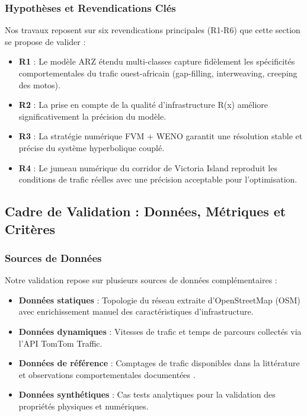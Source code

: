 \subsubsection{Hypothèses et Revendications Clés}
\label{subsec:hypotheses_revendications}

Nos travaux reposent sur six revendications principales (R1-R6) que cette section se propose de valider :

\begin{itemize}
    \item \textbf{R1} : Le modèle ARZ étendu multi-classes capture fidèlement les spécificités comportementales du trafic ouest-africain (gap-filling, interweaving, creeping des motos).
    \item \textbf{R2} : La prise en compte de la qualité d'infrastructure R(x) améliore significativement la précision du modèle.
    \item \textbf{R3} : La stratégie numérique FVM + WENO garantit une résolution stable et précise du système hyperbolique couplé.
    \item \textbf{R4} : Le jumeau numérique du corridor de Victoria Island reproduit les conditions de trafic réelles avec une précision acceptable pour l'optimisation.
\end{itemize}


\subsection{Cadre de Validation : Données, Métriques et Critères}
\label{sec:cadre_validation}

\subsubsection{Sources de Données}
\label{subsec:sources_donnees}

Notre validation repose sur plusieurs sources de données complémentaires :

\begin{itemize}
    \item \textbf{Données statiques} : Topologie du réseau extraite d'OpenStreetMap (OSM) avec enrichissement manuel des caractéristiques d'infrastructure.
    \item \textbf{Données dynamiques} : Vitesses de trafic et temps de parcours collectés via l'API TomTom Traffic.
    \item \textbf{Données de référence} : Comptages de trafic disponibles dans la littérature \cite{ludi2020traffic} et observations comportementales documentées \cite{gomina2013urban}.
    \item \textbf{Données synthétiques} : Cas tests analytiques pour la validation des propriétés physiques et numériques.
\end{itemize}


